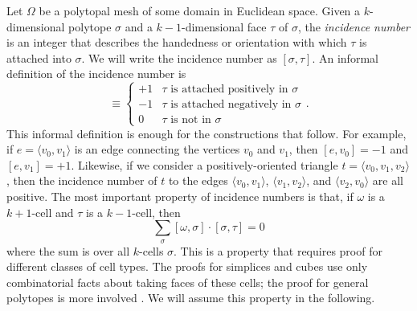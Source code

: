 \documentclass[twocolumn,leqno,twocolumn]{article}
\begin{document}
Let $\Omega$ be a polytopal mesh of some domain in Euclidean space.
Given a $k$-dimensional polytope $\sigma$ and a $k - 1$-dimensional face $\tau$ of $\sigma$, the \emph{incidence number} is an integer that describes the handedness or orientation with which $\tau$ is attached into $\sigma$.
We will write the incidence number as $[\sigma, \tau]$.
An informal definition of the incidence number is
\begin{equation}
    [\sigma, \tau] \equiv \begin{cases} +1 & \tau\text{ is attached positively in }\sigma \\ -1 & \tau\text{ is attached negatively in }\sigma \\ 0 & \tau\text{ is not in }\sigma\end{cases}.
\end{equation}
This informal definition is enough for the constructions that follow.
For example, if $e = \langle v_0, v_1\rangle$ is an edge connecting the vertices $v_0$ and $v_1$, then $[e, v_0] = -1$ and $[e, v_1] = +1$.
Likewise, if we consider a positively-oriented triangle $t = \langle v_0, v_1, v_2\rangle$, then the incidence number of $t$ to the edges $\langle v_0, v_1\rangle$, $\langle v_1, v_2\rangle$, and $\langle v_2, v_0\rangle$ are all positive.
The most important property of incidence numbers is that, if $\omega$ is a $k + 1$-cell and $\tau$ is a $k - 1$-cell, then
\begin{equation}
    \sum_\sigma[\omega,\sigma]\cdot[\sigma,\tau] = 0
    \label{eq:incidence-coefficient-sum}
\end{equation}
where the sum is over all $k$-cells $\sigma$.
This is a property that requires proof for different classes of cell types.
The proofs for simplices and cubes use only combinatorial facts about taking faces of these cells; the proof for general polytopes is more involved \cite{hatcher2002algebraic, massey2019basic}.
We will assume this property in the following.
\end{document}
